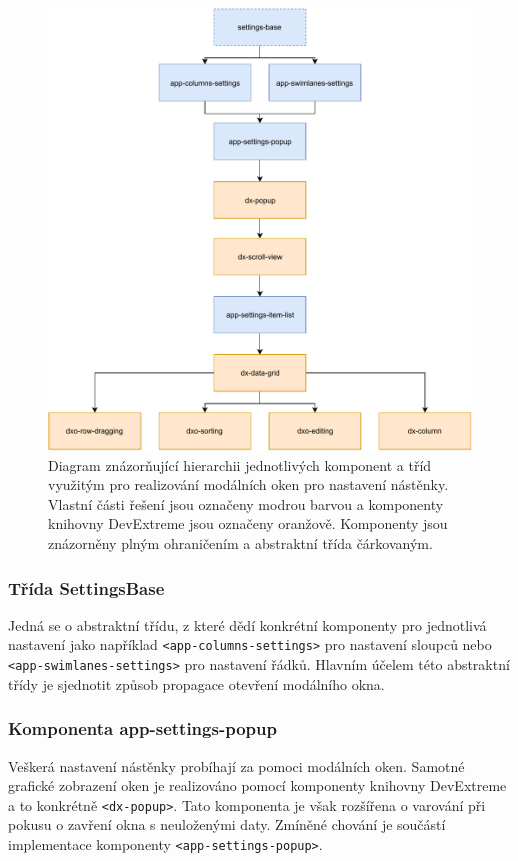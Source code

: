 \begin{figure}[H]
	\centering
	\label{img:settings-dia}
	\includegraphics[width=\textwidth]{obrazky-figures/settings-diagram.pdf}
	\caption{Diagram znázorňující hierarchii jednotlivých komponent a tříd využitým pro realizování modálních oken pro nastavení nástěnky. Vlastní části řešení jsou označeny modrou barvou a komponenty knihovny DevExtreme jsou označeny oranžově. Komponenty jsou znázorněny plným ohraničením a abstraktní třída čárkovaným.}
\end{figure}


\subsubsection*{Třída SettingsBase}
Jedná se o abstraktní třídu, z které dědí konkrétní komponenty pro jednotlivá nastavení jako například \texttt{<app-columns-settings>} pro nastavení sloupců nebo  \texttt{<app-swimlanes-settings>} pro nastavení řádků. Hlavním účelem této abstraktní třídy je sjednotit způsob propagace otevření modálního okna.


\subsubsection*{Komponenta app-settings-popup}
Veškerá nastavení nástěnky probíhají za pomoci modálních oken. Samotné grafické zobrazení oken je realizováno pomocí komponenty knihovny DevExtreme a to konkrétně \texttt{<dx-popup>}. Tato komponenta je však rozšířena o varování při pokusu o zavření okna s neuloženými daty. Zmíněné chování je součástí implementace komponenty \texttt{<app-settings-popup>}.


